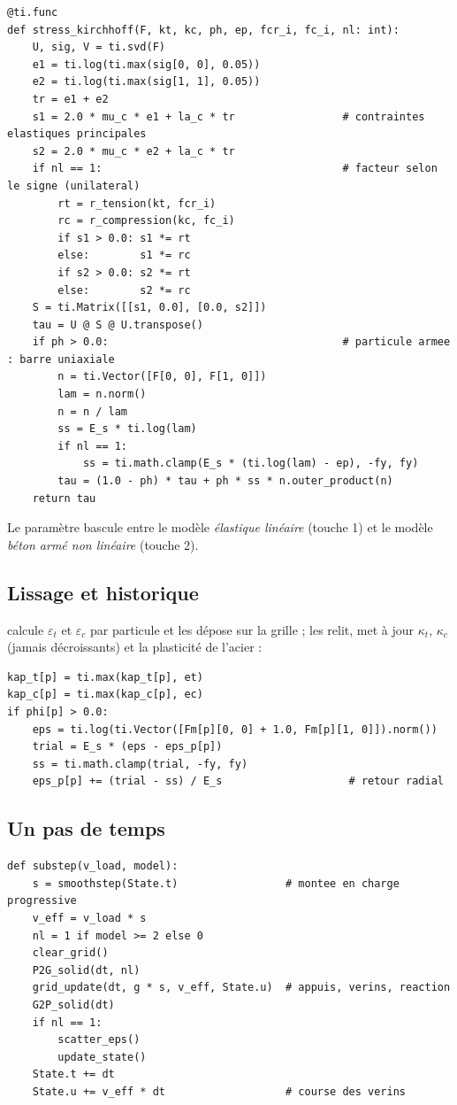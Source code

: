 \documentclass[11pt,a4paper]{article}
\newcommand{\code}[1]{\texttt{\detokenize{#1}}}
\begin{document}
\begin{lstlisting}
@ti.func
def stress_kirchhoff(F, kt, kc, ph, ep, fcr_i, fc_i, nl: int):
    U, sig, V = ti.svd(F)
    e1 = ti.log(ti.max(sig[0, 0], 0.05))
    e2 = ti.log(ti.max(sig[1, 1], 0.05))
    tr = e1 + e2
    s1 = 2.0 * mu_c * e1 + la_c * tr                 # contraintes elastiques principales
    s2 = 2.0 * mu_c * e2 + la_c * tr
    if nl == 1:                                      # facteur selon le signe (unilateral)
        rt = r_tension(kt, fcr_i)
        rc = r_compression(kc, fc_i)
        if s1 > 0.0: s1 *= rt
        else:        s1 *= rc
        if s2 > 0.0: s2 *= rt
        else:        s2 *= rc
    S = ti.Matrix([[s1, 0.0], [0.0, s2]])
    tau = U @ S @ U.transpose()
    if ph > 0.0:                                     # particule armee : barre uniaxiale
        n = ti.Vector([F[0, 0], F[1, 0]])
        lam = n.norm()
        n = n / lam
        ss = E_s * ti.log(lam)
        if nl == 1:
            ss = ti.math.clamp(E_s * (ti.log(lam) - ep), -fy, fy)
        tau = (1.0 - ph) * tau + ph * ss * n.outer_product(n)
    return tau
\end{lstlisting}
Le paramètre \code{nl} bascule entre le modèle \emph{élastique linéaire} (touche 1) et le modèle
\emph{béton armé non linéaire} (touche 2).

\subsection{Lissage et historique}

\code{scatter_eps} calcule $\varepsilon_t$ et $\varepsilon_c$ par particule et les dépose sur la grille ;
\code{update_state} les relit, met à jour $\kappa_t$, $\kappa_c$ (jamais décroissants) et la plasticité de
l'acier :
\begin{lstlisting}
kap_t[p] = ti.max(kap_t[p], et)
kap_c[p] = ti.max(kap_c[p], ec)
if phi[p] > 0.0:
    eps = ti.log(ti.Vector([Fm[p][0, 0] + 1.0, Fm[p][1, 0]]).norm())
    trial = E_s * (eps - eps_p[p])
    ss = ti.math.clamp(trial, -fy, fy)
    eps_p[p] += (trial - ss) / E_s                    # retour radial
\end{lstlisting}

\subsection{Un pas de temps}

\begin{lstlisting}
def substep(v_load, model):
    s = smoothstep(State.t)                 # montee en charge progressive
    v_eff = v_load * s
    nl = 1 if model >= 2 else 0
    clear_grid()
    P2G_solid(dt, nl)
    grid_update(dt, g * s, v_eff, State.u)  # appuis, verins, reaction
    G2P_solid(dt)
    if nl == 1:
        scatter_eps()
        update_state()
    State.t += dt
    State.u += v_eff * dt                   # course des verins
\end{lstlisting}
\end{document}
